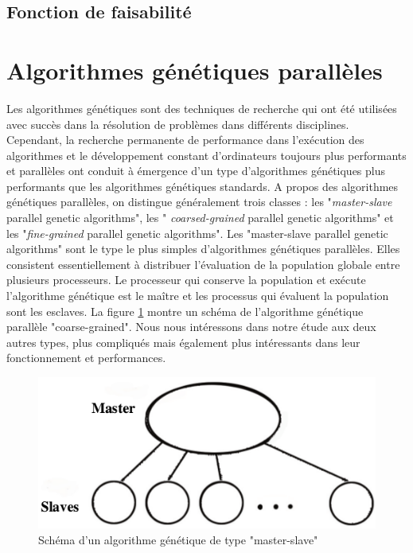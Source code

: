 \documentclass[12pt,a4paper]{article}
\begin{document}
	\subsection{Fonction de faisabilité}
	
	\section{Algorithmes génétiques parallèles}	
	Les algorithmes génétiques sont des techniques de recherche qui ont été utilisées avec succès dans la résolution de problèmes dans différents disciplines. Cependant, la recherche permanente de performance dans l'exécution des algorithmes et le développement constant d'ordinateurs toujours plus performants et parallèles ont conduit à émergence d'un type d'algorithmes génétiques plus performants que les algorithmes génétiques standards. A propos des algorithmes génétiques parallèles, on distingue généralement trois classes : les "\emph{master-slave} parallel genetic algorithms", les "\emph{ coarsed-grained} parallel genetic algorithms" et les "\emph{fine-grained} parallel genetic algorithms". Les "master-slave parallel genetic algorithms" sont le type le plus simples d'algorithmes génétiques parallèles. Elles consistent essentiellement à distribuer l'évaluation de la population globale entre plusieurs processeurs. Le processeur qui conserve la population et exécute l'algorithme génétique est le maître et les processus qui évaluent la population sont les esclaves. La figure \ref{fig:master_slave_ga} montre un schéma de l'algorithme génétique parallèle "coarse-grained". Nous nous intéressons dans notre étude aux deux autres types, plus compliqués mais également plus intéressants dans leur fonctionnement et performances.
	
	\begin{figure}[!h]
		\begin{center}
			\includegraphics[scale=.3]{img/master_slave_ga.png}
			\caption{Schéma d'un algorithme génétique de type "master-slave"}
			\label{fig:master_slave_ga}
		\end{center}
	\end{figure}
	
\end{document}
